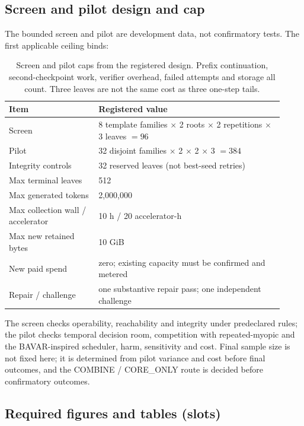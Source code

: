 \subsection{Screen and pilot design and cap}
\label{sec:b-cap}

The bounded screen and pilot are development data, not confirmatory tests.  The
first applicable ceiling binds:

\begin{table}[t]
\centering
\small
\setlength{\tabcolsep}{4pt}
\begin{tabular}{@{}p{0.30\linewidth}p{0.62\linewidth}@{}}
\toprule
Item & Registered value \\
\midrule
Screen & 8 template families $\times$ 2 roots $\times$ 2 repetitions $\times$ 3 leaves $=96$ \\
Pilot & 32 disjoint families $\times$ 2 $\times$ 2 $\times$ 3 $=384$ \\
Integrity controls & 32 reserved leaves (not best-seed retries) \\
Max terminal leaves & 512 \\
Max generated tokens & 2{,}000{,}000 \\
Max collection wall / accelerator & 10 h / 20 accelerator-h \\
Max new retained bytes & 10 GiB \\
New paid spend & zero; existing capacity must be confirmed and metered \\
Repair / challenge & one substantive repair pass; one independent challenge \\
\bottomrule
\end{tabular}
\caption{Screen and pilot caps from the registered design.  Prefix
continuation, second-checkpoint work, verifier overhead, failed attempts and
storage all count.  Three leaves are not the same cost as three one-step tails.}
\label{tab:b-cap}
\end{table}

The screen checks operability, reachability and integrity under predeclared
rules; the pilot checks temporal decision room, competition with
repeated-myopic and the BAVAR-inspired scheduler, harm, sensitivity and cost.  Final sample size is not fixed here; it
is determined from pilot variance and cost before final outcomes, and the
COMBINE / CORE\_ONLY route is decided before confirmatory outcomes.

\subsection{Required figures and tables (slots)}

